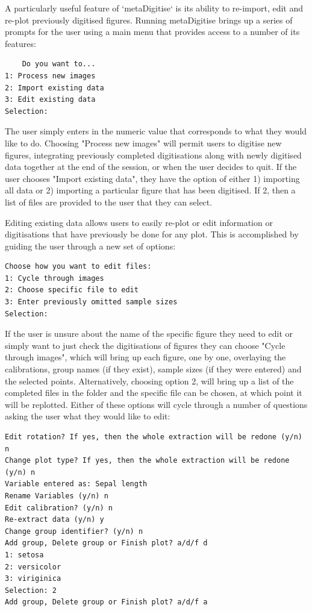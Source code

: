 \documentclass{article}
\begin{document}
A particularly useful feature of `metaDigitise` is its ability to re-import, edit and re-plot previously digitised figures. Running metaDigitise brings up a series of prompts for the user using a main menu that provides access to a number of its features: 

\begin{verbatim}
	Do you want to...
1: Process new images
2: Import existing data
3: Edit existing data
Selection: 
\end{verbatim}

The user simply enters in the numeric value that corresponds to what they would like to do. Choosing "Process new images" will permit users to digitise new figures, integrating previously completed digitisations along with newly digitised data together at the end of the session, or when the user decides to quit. If the user chooses "Import existing data", they have the option of either 1) importing all data or 2) importing a particular figure that has been digitised. If 2, then a list of files are provided to the user that they can select. 

Editing existing data allows users to easily re-plot or edit information or digitisations that have previously be done for any plot. This is accomplished by guiding the user through a new set of options:

\begin{verbatim}
Choose how you want to edit files:
1: Cycle through images
2: Choose specific file to edit
3: Enter previously omitted sample sizes
Selection: 
\end{verbatim}

If the user is unsure about the name of the specific figure they need to edit or simply want to just check the digitisations of figures they can choose "Cycle through images", which will bring up each figure, one by one, overlaying the calibrations, group names (if they exist), sample sizes (if they were entered) and the selected points. Alternatively, choosing option 2, will bring up a list of the completed files in the folder and the specific file can be chosen, at which point it will be replotted. Either of these options will cycle through a number of questions asking the user what they would like to edit:

\begin{verbatim}
Edit rotation? If yes, then the whole extraction will be redone (y/n) n
Change plot type? If yes, then the whole extraction will be redone (y/n) n
Variable entered as: Sepal length
Rename Variables (y/n) n
Edit calibration? (y/n) n
Re-extract data (y/n) y
Change group identifier? (y/n) n
Add group, Delete group or Finish plot? a/d/f d
1: setosa
2: versicolor
3: viriginica
Selection: 2
Add group, Delete group or Finish plot? a/d/f a
\end{verbatim}
\end{document}
